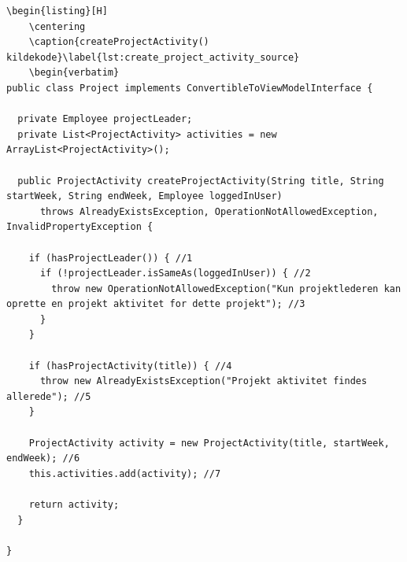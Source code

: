 \begin{listing}[H]
\begin{verbatim}
\begin{listing}[H]
    \centering
    \caption{createProjectActivity() kildekode}\label{lst:create_project_activity_source}
    \begin{verbatim}
public class Project implements ConvertibleToViewModelInterface {

  private Employee projectLeader;
  private List<ProjectActivity> activities = new ArrayList<ProjectActivity>();

  public ProjectActivity createProjectActivity(String title, String startWeek, String endWeek, Employee loggedInUser)
      throws AlreadyExistsException, OperationNotAllowedException, InvalidPropertyException {
        
    if (hasProjectLeader()) { //1
      if (!projectLeader.isSameAs(loggedInUser)) { //2
        throw new OperationNotAllowedException("Kun projektlederen kan oprette en projekt aktivitet for dette projekt"); //3
      }
    }
    
    if (hasProjectActivity(title)) { //4
      throw new AlreadyExistsException("Projekt aktivitet findes allerede"); //5
    }
    
    ProjectActivity activity = new ProjectActivity(title, startWeek, endWeek); //6
    this.activities.add(activity); //7

    return activity;
  }
  
}

    \end{verbatim}
\end{listing}
